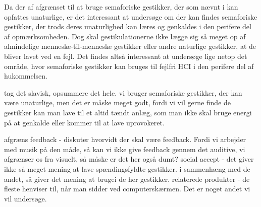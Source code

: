 Da der af afgrænset til at bruge semaforiske gestikker, der som nævnt i  kan opfattes unaturlige, er det interessant at undersøge om der kan findes semaforiske gestikker, der trods deres unaturlighed kan læres og genkaldes i den perifere del af opmærksomheden. Dog skal gestikulationerne ikke lægge sig så meget op af almindelige menneske-til-menneske gestikker eller andre naturlige gestikker, at de bliver lavet ved en fejl. Det findes altså interessant at undersøge lige netop det område, hvor semaforiske gestikker kan bruges til fejlfri HCI i den perifere del af hukommelsen. 

tag det slavisk, opsummere det hele.
 vi bruger semaforiske gestikker, der kan være unaturlige, men det er måske meget godt, fordi vi vil gerne finde de gestikker kan man lave til et altid tændt anlæg, som man ikke skal bruge energi på at genkalde eller kommer til at lave uprovokeret. 




afgræns feedback - diskuter hvorvidt der skal være feedback. Fordi vi arbejder med musik på den måde, så kan vi ikke give feedback gennem det auditive, vi afgrænser os fra visuelt, så måske er det her også dumt?
social accept - det giver ikke så meget mening at lave spændingsfyldte gestikker. i sammenhæng med de andet, så giver det mening at brugei de her gestikker. 
relaterede produkter - de fleste henviser til, når man sidder ved computerskærmen. Det er noget andet vi vil undersøge. 
